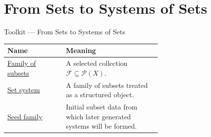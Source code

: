 \section{From Sets to Systems of Sets}

\begin{toolkitbox}{Toolkit --- From Sets to Systems of Sets}
\small
\begin{tabular}{l p{0.62\linewidth}}
\toprule
\textbf{Name} & \textbf{Meaning} \\
\midrule
\hyperref[def:family-of-subsets]{Family of subsets} &
A selected collection \(\mathcal{F}\subseteq\mathcal{P}(X)\). \\
\hyperref[def:set-system]{Set system} &
A family of subsets treated as a structured object. \\
\hyperref[def:seed-family]{Seed family} &
Initial subset data from which later generated systems will be formed. \\
\bottomrule
\end{tabular}
\end{toolkitbox}





